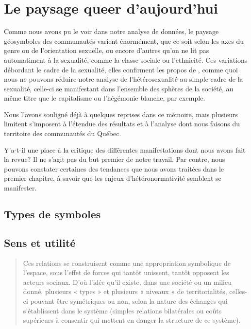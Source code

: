 
\chapter{Le paysage queer d'aujourd'hui}
\label{cha:le_paysage_queer_d_aujourd_hui}
Comme nous avons pu le voir dans notre analyse de données, le paysage géosymboles des communautés \lgbt{} varient énormément, que ce soit selon les axes du genre ou de l'orientation sexuelle, ou encore d'autres qu'on ne lit pas automatiment à la sexualité, comme la classe sociale ou l'ethnicité.
Ces variations débordant le cadre de la sexualité, elles confirment les propos de , comme quoi nous ne pouvons réduire notre analyse de l'hétérosexualité au simple cadre de la sexualité, celle-ci se manifestant dans l'ensemble des sphères de la société, au même titre que le capitalisme ou l'hégémonie blanche, par exemple.


Nous l'avons souligné déjà à quelques reprises dans ce mémoire, mais plusieurs limitent s'imposent à l'étendue des résultats et à l'analyse dont nous faisons du territoire des communautés \lgbt{} du Québec.

Y'a-t-il une place à la critique des différentes manifestations dont nous avons fait la revue?
Il ne s'agit pas du but premier de notre travail.
Par contre, nous pouvons constater certaines des tendances que nous avons traitées dans le premier chapitre, à savoir que les enjeux d'hétéronormativité semblent se manifester.

\section{Types de symboles}
\label{sec:types_de_symboles}


\section{Sens et utilité}
\label{sec:sens_et_utilit_}
\begin{quotation}
Ces relations se construisent comme une appropriation symbolique de l'espace, sous l'effet de forces qui tantôt unissent, tantôt opposent les acteurs sociaux. 
D'où l'idée qu'il existe, dans une société ou un milieu donné, plusieurs « types » et plusieurs « niveaux » de territorialités, celles-ci pouvant être symétriques ou non, selon la nature des échanges qui s'établissent dans le système (simples relations bilatérales ou coûts supérieurs à consentir qui mettent en danger la structure de ce système).\citep[41]{Courville1991}
\end{quotation}

